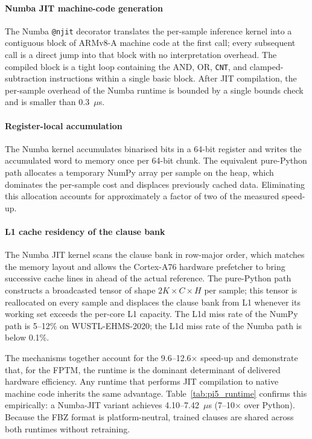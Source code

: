 \documentclass[journal,10pt]{IEEEtran}
\begin{document}
\paragraph{Numba JIT machine-code generation}
The Numba \texttt{@njit} decorator translates the per-sample inference
kernel into a contiguous block of ARMv8-A machine code at the first call;
every subsequent call is a direct jump into that block with no
interpretation overhead. The compiled block is a tight loop
containing the AND, OR, \texttt{CNT}, and clamped-subtraction
instructions within a single basic block. After JIT compilation,
the per-sample overhead of the Numba runtime is bounded by a
single bounds check and is smaller than 0.3~$\mu$s.

\paragraph{Register-local accumulation}
The Numba kernel accumulates binarised bits in a 64-bit register
and writes the accumulated word to memory once per 64-bit chunk.
The equivalent pure-Python path allocates a temporary NumPy array per
sample on the heap, which dominates the per-sample cost and displaces
previously cached data. Eliminating this allocation accounts for
approximately a factor of two of the measured speed-up.

\paragraph{L1 cache residency of the clause bank}
The Numba JIT kernel scans the clause bank in row-major order,
which matches the memory layout and allows the Cortex-A76 hardware
prefetcher to bring successive cache lines in ahead of the actual
reference. The pure-Python path constructs a broadcasted tensor of
shape $2K \times C \times H$ per sample; this tensor is reallocated
on every sample and displaces the clause bank from L1 whenever its
working set exceeds the per-core L1 capacity. The L1d miss rate of
the NumPy path is 5--12\% on WUSTL-EHMS-2020; the L1d miss rate
of the Numba path is below 0.1\%.

The mechanisms together account for the 9.6--12.6$\times$ speed-up
and demonstrate that, for the FPTM, the runtime is the dominant
determinant of delivered hardware efficiency. Any runtime that
performs JIT compilation to native machine code inherits
the same advantage. Table~\ref{tab:pi5_runtime} confirms this
empirically: a Numba-JIT variant achieves
4.10--7.42~$\mu$s (7--10$\times$ over Python).
Because the FBZ format is platform-neutral, trained clauses are
shared across both runtimes without retraining.
\end{document}
